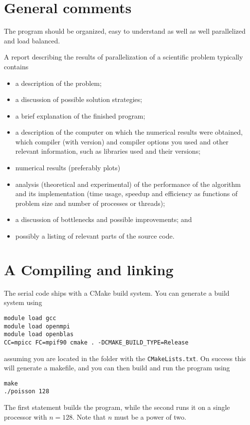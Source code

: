 \documentclass[onecolumn, oneside, a4paper, 11pt]{memoir}
\theoremstyle{remark}
\begin{document}
\section{General comments}

The program should be organized, easy to understand as well as well parallelized and load balanced.

A report describing the results of parallelization of a scientific problem
typically contains
\begin{itemize}
\item a description of the problem;
\item a discussion of possible solution strategies;
\item a brief explanation of the finished program;
\item a description of the computer on which the numerical results were
  obtained, which compiler (with version) and compiler options you used and
  other relevant information, such as libraries used and their versions;
\item numerical results (preferably plots)
\item analysis (theoretical and experimental) of the performance of the
  algorithm and its implementation (time usage, speedup and efficiency as
  functions of problem size and number of processes or threads);
\item a discussion of bottlenecks and possible improvements; and
\item possibly a listing of relevant parts of the source code.
\end{itemize}

\section{A \quad Compiling and linking}

The serial code ships with a CMake build system. You can generate a build system
using
\begin{lstlisting}
module load gcc
module load openmpi
module load openblas
CC=mpicc FC=mpif90 cmake . -DCMAKE_BUILD_TYPE=Release
\end{lstlisting}
assuming you are located in the folder with the \texttt{CMakeLists.txt}. On
success this will generate a makefile, and you can then build and run the
program using
\begin{lstlisting}
make
./poisson 128
\end{lstlisting}
The first statement builds the program, while the second runs it on a single
processor with $n=128$. Note that $n$ must be a power of two.
\end{document}
